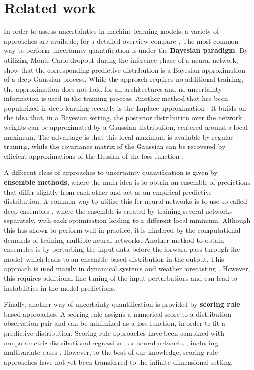 \section{Related work}
In order to assess uncertainties in machine learning models, a variety of approaches are available; for a detailed overview compare \citet{abdar_review_2021}. The most common way to perform uncertainty quantification is under the \textbf{Bayesian paradigm}. By utilizing Monte Carlo dropout during the inference phase of a neural network, \cite{pmlr-v48-gal16} show that the corresponding predictive distribution is a Bayesian approximation of a deep Gaussian process. While the approach requires no additional training, the approximation does not hold for all architectures and no uncertainty information is used in the training process. Another method that has been popularized in deep learning recently is the Laplace approximation \citep{NEURIPS2021_a7c95857}. It builds on the idea that, in a Bayesian setting, the posterior distribution over the network weights can be approximated by a Gaussian distribution, centered around a local maximum. The advantage is that this local maximum is available by regular training, while the covariance matrix of the Gaussian can be recovered by efficient approximations of the Hessian of the loss function \citep{botev_practical_2017}. 

A different class of approaches to uncertainty quantification is given by \textbf{ensemble methods}, where the main idea is to obtain an ensemble of predictions that differ slightly from each other and act as an empirical predictive distribution. A common way to utilize this for neural networks is to use so-called deep ensembles \citep{NIPS2017_9ef2ed4b}, where the ensemble is created by training several networks separately, with each optimization leading to a different local minimum. Although this has shown to perform well in practice, it is hindered by the computational demands of training multiple neural networks. Another method to obtain ensembles is by perturbing the input data before the forward pass through the model, which leads to an ensemble-based distribution in the output. This approach is used mainly in dynamical systems and weather forecasting \citep{bi_accurate_2023, bulte_uncertainty_2024}. However, this requires additional fine-tuning of the input perturbations and can lead to instabilities in the model predictions.

Finally, another way of uncertainty quantification is provided by \textbf{scoring rule}-based approaches. A scoring rule \citep{Gneiting.2007} assigns a numerical score to a distribution-observation pair and can be minimized as a loss function, in order to fit a predictive distribution. Scoring rule approaches have been combined with nonparametric distributional regression \citep{walz_easy_2024}, or neural networks \citep{rasp_neural_2018}, including multivariate cases \citep{JMLR:v25:23-0038, chen_generative_2024}. However, to the best of our knowledge, scoring rule approaches have not yet been transferred to the infinite-dimensional setting.

